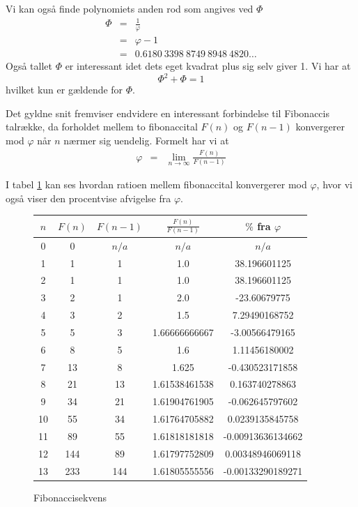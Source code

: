 {Vi kan også finde polynomiets anden rod som angives ved $\varPhi$
\begin{eqnarray*}
	\varPhi & = & \frac{1}{\varphi} \\
		& = & \varphi - 1 \\
		& = & 0.6180\ 3398\ 8749\ 8948\ 4820 \dots 
\end{eqnarray*}
Også tallet $\varPhi$ er interessant idet dets eget kvadrat plus sig
selv giver 1. Vi har at
\begin{equation}
	\varPhi^{2} + \varPhi = 1
	\label{Phi_squared}
\end{equation}
hvilket kun er gældende for $\varPhi$.

Det gyldne snit fremviser endvidere en interessant forbindelse til
Fibonaccis talrække, da forholdet mellem to fibonaccital $F(n)$ og $F(n
- 1)$ konvergerer mod $\varphi$ når $n$ nærmer sig uendelig. Formelt har
vi at
\begin{eqnarray*}
	\varphi & =     & \lim_{n \rightarrow
	\infty}{\frac{F(n)}{F(n - 1)}}
\end{eqnarray*}

I tabel \ref{fibonacci_sequence} kan ses hvordan ratioen mellem
fibonaccital konvergerer mod $\varphi$, hvor vi også viser den
procentvise afvigelse fra $\varphi$.

\begin{figure}[h!]
	\begin{center}
		\begin{tabular}{|c|c|c|c|c|}
			\hline
			$n$ & $F(n)$ & $F(n - 1)$ & $ \frac{F(n)}{F(n - 1)}$ & $\%$ fra $\varphi$ \\
			\hline
			0	 & 0 	 & $n/a$ & $n/a$ 		& $n/a$ 		\\
			1	 & 1	 & 1	 & 1.0		 	& 38.196601125 		\\
			2	 & 1	 & 1	 & 1.0		 	& 38.196601125 		\\
			3	 & 2	 & 1	 & 2.0		 	& -23.60679775 		\\
			4	 & 3	 & 2	 & 1.5			& 7.29490168752 	\\
			5	 & 5	 & 3	 & 1.66666666667	& -3.00566479165 	\\
			6	 & 8	 & 5	 & 1.6			& 1.11456180002 	\\
			7	 & 13	 & 8	 & 1.625	 	& -0.430523171858 	\\
			8	 & 21	 & 13	 & 1.61538461538	& 0.163740278863 	\\
			9	 & 34	 & 21	 & 1.61904761905	& -0.062645797602 	\\
			10	 & 55	 & 34	 & 1.61764705882	& 0.0239135845758 	\\
			11	 & 89	 & 55	 & 1.61818181818	& -0.00913636134662 	\\
			12	 & 144	 & 89	 & 1.61797752809	& 0.00348946069118 	\\
			13	 & 233	 & 144	 & 1.61805555556	& -0.00133290189271 	\\
			\hline
		\end{tabular}
	\end{center}
	\caption{Fibonaccisekvens}
	\label{fibonacci_sequence}
\end{figure}

}
